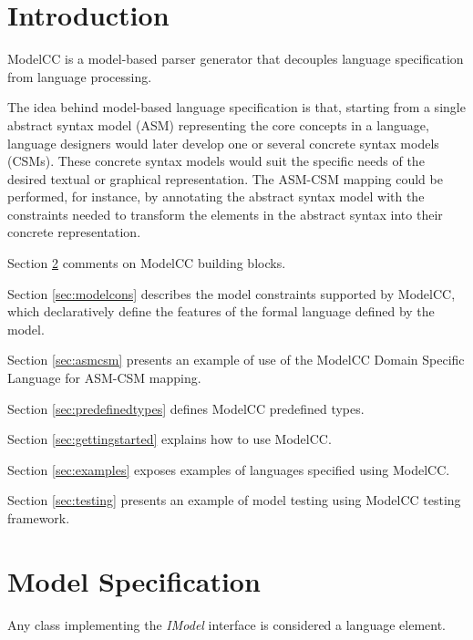 \documentclass[a4paper,twoside,onecolumn]{article}
\newcommand{\pb}{\newpage}
\newcommand{\empt}{\pb \thispagestyle{empty} \rule[0mm]{0mm}{0mm} \pb}
\begin{document}


\pagestyle{empty}

\tableofcontents

\cleardoublepage

\pagestyle{fancy}

\newpage
\section{Introduction} 

ModelCC is a model-based parser generator that decouples language specification from language processing.

The idea behind model-based language specification is that, starting from a single abstract syntax model (ASM) representing the core concepts in
a language, language designers would later develop one or several concrete syntax models (CSMs). These concrete syntax models would suit the
specific needs of the desired textual or graphical representation. The ASM-CSM mapping could be performed, for instance, by annotating the
abstract syntax model with the constraints needed to transform the elements in the abstract syntax into their concrete representation.


Section \ref{sec:modelspec} comments on ModelCC building blocks.

Section \ref{sec:modelcons} describes the model constraints supported by ModelCC, which declaratively define the features of the formal language defined by the model.

Section \ref{sec:asmcsm} presents an example of use of the ModelCC Domain Specific Language for ASM-CSM mapping.

Section \ref{sec:predefinedtypes} defines ModelCC predefined types.

Section \ref{sec:gettingstarted} explains how to use ModelCC.

Section \ref{sec:examples} exposes examples of languages specified using ModelCC.

Section \ref{sec:testing} presents an example of model testing using ModelCC testing framework.

\section{Model Specification} \label{sec:modelspec}

Any class implementing the \emph{IModel} interface is considered a language element.
\end{document}
